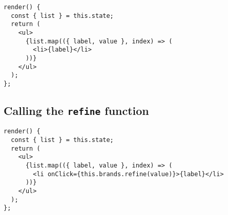 \begin{minipage}{\linewidth}
\begin{lstlisting}[caption={Taking the data from the refinement and applying it to DOM},label={lst:core-react-dom}]
render() {
  const { list } = this.state;
  return (
    <ul>
      {list.map(({ label, value }, index) => (
        <li>{label}</li>
      ))}
    </ul>
  );
};
\end{lstlisting}
\end{minipage}


\subsection{Calling the {\tt refine} function}
\label{subs:refining}

\begin{minipage}{\linewidth}
\begin{lstlisting}[caption={Refining on a user action},label={lst:core-react-refine}]
render() {
  const { list } = this.state;
  return (
    <ul>
      {list.map(({ label, value }, index) => (
        <li onClick={this.brands.refine(value)}>{label}</li>
      ))}
    </ul>
  );
};
\end{lstlisting}
\end{minipage}


